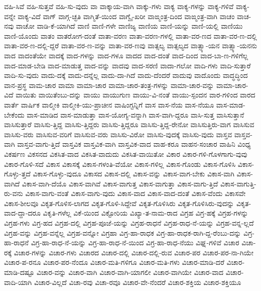 {ವಹಿ-ಸಿವೆ
ವಹಿ-ಸುತ್ತವೆ
ವಹಿ-ಸು-ವುದು
ವಾ
ವಾಕ್ಕಾಯ-ವಾಗಿ
ವಾಕ್ಕು-ಗಳು
ವಾಕ್ಯ
ವಾಕ್ಯ-ಗಳನ್ನು
ವಾಕ್ಯ-ಗಳಿವೆ
ವಾಕ್ಯ-ವನ್ನೇ
ವಾಕ್ಯ-ವಿದೆ
ವಾಗ್
ವಾಗ್ಗ-ಚ್ಛತಿ
ವಾಗ್ಮಿತೆ-ಯಿಂದ
ವಾಗ್ವೈ-ಖರೀ
ವಾಙ್ಮಂತ್ರ-ದಿಂದ
ವಾಙ್ಮಂತ್ರ-ವಾಗಿ
ವಾಚಂ
ವಾಚ-ನವು
ವಾಚೋ
ವಾಡಿ-ಕೆ-ಯಾಗಿದೆ
ವಾಣಿ
ವಾಣಿ-ಗಳೇ
ವಾಣಿಜ್ಯ
ವಾಣಿಯ
ವಾಣಿ-ಯನ್ನು
ವಾಣಿ-ಯಲ್ಲಿ
ವಾಣಿಯು
ವಾಣಿ-ಯೊಂದು
ವಾತಂ
ವಾತರೋಗ-ದಂತೆ
ವಾತಾ-ವರಣ
ವಾತಾ-ವರಣ-ಗಳಲ್ಲಿ
ವಾತಾ-ವರ-ಣದ
ವಾತಾ-ವರ-ಣ-ದಲ್ಲಿ
ವಾತಾ-ವರ-ಣ-ದಲ್ಲಿ-ದ್ದರೆ
ವಾತಾ-ವರ-ಣ-ವನ್ನು
ವಾತಾ-ವರ-ಣವು
ವಾತ್ಸಲ್ಯ
ವಾತ್ಸಲ್ಯದ
ವಾತ್ಸ್ಯಾ-ಯನ
ವಾತ್ಸ್ಯಾ-ಯನನು
ವಾದ
ವಾದಂತೆಯೇ
ವಾದಕ್ಕೆ
ವಾದ-ಗಳನ್ನು
ವಾದ-ಗಳೂ
ವಾದದ
ವಾದ-ದಂತೆ
ವಾದ-ದಿಂದ
ವಾದ-ಬಾ-ಣ-ಗಳಿಗೆಲ್ಲ
ವಾದ-ಮಾಡ-ಬೇಡಿ
ವಾದ-ಮಾಡುತ್ತ
ವಾದ-ವನ್ನು
ವಾದವು
ವಾದ-ಸರಣಿ
ವಾದಾ-ಗಲೋ
ವಾದಿ-ಗಳು
ವಾದಿ-ಸುತ್ತಾರೆ
ವಾದಿ-ಸು-ವುದು
ವಾದು-ದಕ್ಕೆ
ವಾದು-ದನ್ನೆಲ್ಲ
ವಾದು-ದಾ-ಗಿದೆ
ವಾದು-ದೆಂದರೆ
ವಾದುವು
ವಾದೊಂದು
ವಾದ್ಧದ್ಧಿಂದ
ವಾನ-ಪ್ರಸ್ಥ
ವಾಮ-ಚಾರ
ವಾಮಾ
ವಾಮಾ-ಚಾರ
ವಾಮಾ-ಚಾರ-ತಂತ್ರ-ಗಳನ್ನು
ವಾಮಾ-ಚಾರ-ವನ್ನು
ವಾಮಾ-ಚಾರ-ವಿದೆ
ವಾಯಿತು
ವಾಯಿತೆಂಬು-ದನ್ನು
ವಾಯು
ವಾಯುಗುಣ
ವಾಯು-ವಿ-ನಂತೆ
ವಾಯು-ಸ್ಪಂದನ
ವಾರ-ಗಳಿಂದ
ವಾರದ
ವಾರ್ತೆ
ವಾರ್ಷಿಕ
ವಾಲ್ಮೀಕಿ
ವಾಲ್ಮೀಕಿ-ಯು-ಪ್ರಾಚೀನ
ವಾಷಿಂಗ್ಟನ್ನಿಗೆ
ವಾಸ
ವಾಸ-ನೆಯ
ವಾಸ-ನೆಯೂ
ವಾಸ-ಮಾಡ-ಬೇಕೆಂದು
ವಾಸ-ಮಾಡಿದ
ವಾಸ-ಮಾಡುತ್ತಾ
ವಾಸ-ಯೋಗ್ಯ-ವನ್ನಾಗಿ
ವಾಸ-ವಾಗಿ-ದ್ದರೂ
ವಾಸಿ-ಸುತ್ತ
ವಾಸಿಸುತ್ತಾನೆ
ವಾಸಿಸುತ್ತಾರೆ
ವಾಸಿಸು-ತ್ತಿದ್ದ
ವಾಸಿಸು-ತ್ತಿದ್ದರು
ವಾಸಿಸು-ತ್ತಿದ್ದರೂ
ವಾಸಿಸು-ತ್ತಿದ್ದ-ರೇನೋ
ವಾಸಿಸುತ್ತಿರು-ವಾಗ
ವಾಸಿಸುವ
ವಾಸಿಸು-ವರು
ವಾಸಿಸುವ-ವರಿಗೆ
ವಾಸಿಸುವ-ವರು
ವಾಸಿಸು-ವಿರೋ
ವಾಸಿಸು-ವುದಕ್ಕೆ
ವಾಸಿಸು-ವುದು
ವಾಸ್ತವ
ವಾಸ್ತವ-ವಾಗಿ
ವಾಸ್ತವ-ವಾಗು-ತ್ತಿದೆ
ವಾಸ್ತವಿಕ
ವಾಸ್ತವಿಕ-ವಾಗಿ
ವಾಸ್ತವಿಕ-ವಾದ
ವಾಹ-ಕರೂ
ವಾಹನ-ಸಂಚಾರ
ವಾಹಿನಿ
ವಿಂಧ್ಯ
ವಿಕರ್ಷಣ
ವಿಕಸನದ
ವಿಕಸಿತ-ವಾದ
ವಿಕಸಿತ-ವಾದುದು
ವಿಕಸಿತ-ವಾಯಿತೋ
ವಿಕಾರ
ವಿಕಾರ-ಗಳಿ-ಗೊಳಗಾಗು-ವುವು
ವಿಕಾರ-ಗೊಳಿ-ಸದೆ
ವಿಕಾಸ
ವಿಕಾಸಕ್ಕೆ
ವಿಕಾಸ-ಗಳಂತಿ-ವೆಯೋ
ವಿಕಾಸ-ಗಳಿಲ್ಲ
ವಿಕಾಸ-ಗೊಂಡು
ವಿಕಾಸ-ಗೊಳಿಸಿ
ವಿಕಾಸ-ಗೊಳ್ಳು-ತ್ತದೆ
ವಿಕಾಸ-ಗೊಳ್ಳು-ವುದೂ
ವಿಕಾಸದ
ವಿಕಾಸ-ದಲ್ಲಿ
ವಿಕಾಸ-ವನ್ನು
ವಿಕಾಸ-ವಾಗ-ಬೇಕು
ವಿಕಾಸ-ವಾಗಿ
ವಿಕಾಸ-ವಾಗಿದೆ
ವಿಕಾಸ-ವಾಗಿ-ದೆಯೊ
ವಿಕಾಸ-ವಾಗಿವೆ
ವಿಕಾಸ-ವಾಗುತ್ತ
ವಿಕಾಸ-ವಾಗುತ್ತಾ
ವಿಕಾಸ-ವಾಗು-ತ್ತಿದೆ
ವಿಕಾಸ-ವಾಗುತ್ತಿ-ರು-ವನು
ವಿಕಾಸ-ವಾಗು-ವಂತೆ
ವಿಕಾಸ-ವಾಗು-ವುದು
ವಿಕಾಸ-ವಾದ
ವಿಕಾಸ-ವಾದ-ದಂತೆ
ವಿಕಾಸ-ವೆಂದು
ವಿಕಾಸವೇ
ವಿಕಾಸ-ಶೀಲವೂ
ವಿಕೃತ-ಗೊಳಿಸ-ಲಾಗದ
ವಿಕೃತ-ಗೊಳಿ-ಸಿದ್ದೇವೆ
ವಿಕೃತ-ಗೊಳಿಸಿರು
ವಿಕೃತ-ಗೊಳಿಸಿರು-ವುದನ್ನು
ವಿಕೃತ-ವಾದ-ದ್ದಾ-ದರೂ
ವಿಕೃತಿ-ಗಳೆಲ್ಲ
ವಿಕೆ-ಯಿಂದ
ವಿಕ್ಟೋರಿಯ
ವಿಖ್ಯಾ-ತ-ನಾಮ-ರಾದ
ವಿಗ್ರಹ
ವಿಗ್ರ-ಹಕ್ಕೆ
ವಿಗ್ರಹ-ಗಳನ್ನು
ವಿಗ್ರಹ-ಗಳು
ವಿಗ್ರ-ಹದ
ವಿಗ್ರಹ-ದಲ್ಲಿ
ವಿಗ್ರಹ-ಪೂಜೆ-ಯನ್ನು
ವಿಗ್ರಹ-ರಾಧನೆ
ವಿಗ್ರಹ-ರಾಧ-ನೆ-ಯನ್ನು
ವಿಗ್ರಹ-ವನ್ನ-ಲ್ಲದೆ
ವಿಗ್ರಹ-ವನ್ನು
ವಿಗ್ರಹ-ವನ್ನೆಲ್ಲ
ವಿಗ್ರಹ-ವನ್ನೋ
ವಿಗ್ರಹಾ
ವಿಗ್ರ-ಹಾ-ರಾಧಕ
ವಿಗ್ರ-ಹಾ-ರಾಧಕ-ರಾಗಿ-ದ್ದ-ರೆಂಬು-ದನ್ನು
ವಿಗ್ರ-ಹಾ-ರಾಧನೆ
ವಿಗ್ರ-ಹಾ-ರಾಧ-ನೆ-ಯನ್ನು
ವಿಗ್ರ-ಹಾ-ರಾಧ-ನೆ-ಯಿಂದ
ವಿಗ್ರ-ಹಾ-ರಾಧ-ನೆಯು
ವಿಘ್ನ-ಗಳಿವೆ
ವಿಚಾರ
ವಿಚಾ-ರಕ್ಕೆ
ವಿಚಾರ-ಗಳನ್ನು
ವಿಚಾರ-ಗಳು
ವಿಚಾರದ
ವಿಚಾರ-ದಲ್ಲಿ
ವಿಚಾರ-ದಲ್ಲಿ-ರುವ
ವಿಚಾರ-ಪರ
ವಿಚಾರ-ಪರ-ನಾ-ಗಿಯೇ
ವಿಚಾರ-ಪ-ರನೂ
ವಿಚಾರ-ಪರ-ನೆಂದೂ
ವಿಚಾರ-ಮತಿ-ಗಳಿಗೂ
ವಿಚಾರ-ಮತಿ-ಗಳು
ವಿಚಾರ-ಮಾಡಿ-ದರೆ
ವಿಚಾರ-ಮಾಡಿ-ದಷ್ಟೂ
ವಿಚಾರ-ವನ್ನು
ವಿಚಾರ-ವಾಗಿ
ವಿಚಾರ-ವಾಗಿ-ಯಾಗಲೀ
ವಿಚಾರ-ವಾಗಿಯೇ
ವಿಚಾರ-ವಾದ
ವಿಚಾರ-ವಾದಿ-ಯಾಗಿ
ವಿಚಾರ-ವಿಲ್ಲದೆ
ವಿಚಾ-ರವು
ವಿಚಾ-ರವೂ
ವಿಚಾರ-ವೇ-ನೆಂದರೆ
ವಿಚಾರ-ಶಕ್ತಿಯ
ವಿಚಾರ-ಶಕ್ತಿಯೂ
}
